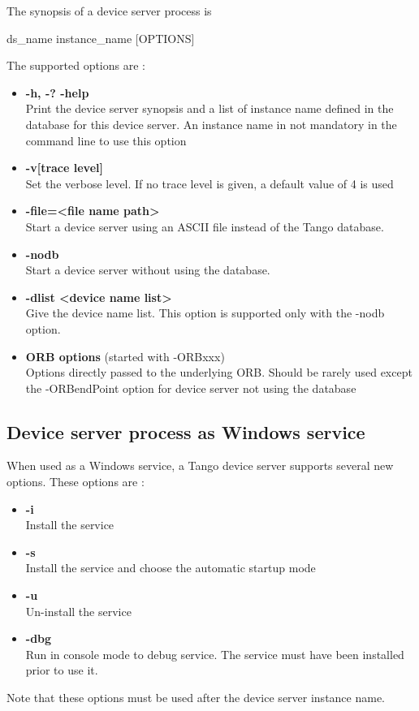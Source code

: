 The synopsis of a device server process is\begin{center}ds\_name
instance\_name {[}OPTIONS{]}\end{center}The supported options are
:
\begin{itemize}
\item \textbf{-h, -? -help}\\
Print the device server synopsis and a list of instance name defined
in the database for this device server. An instance name in not mandatory
in the command line to use this option
\item \textbf{-v{[}trace level{]}}\\
Set the verbose level. If no trace level is given, a default value
of 4 is used
\item \textbf{-file=<file name path>}\\
Start a device server using an ASCII file instead of the Tango database. 
\item \textbf{-nodb}\\
Start a device server without using the database.
\item \textbf{-dlist <device name list>}\\
Give the device name list. This option is supported only with the
-nodb option.
\item \textbf{ORB options} (started with -ORBxxx)\\
Options directly passed to the underlying ORB. Should be rarely used
except the -ORBendPoint option for device server not using the database
\end{itemize}

\subsection{Device server process as Windows service}

When used as a Windows service, a Tango device server
supports several new options. These options are :
\begin{itemize}
\item \textbf{-i}\\
Install the service
\item \textbf{-s}\\
Install the service and choose the automatic startup mode
\item \textbf{-u}\\
Un-install the service
\item \textbf{-dbg}\\
Run in console mode to debug service. The service must have been installed
prior to use it.
\end{itemize}
Note that these options must be used after the device server instance
name.


